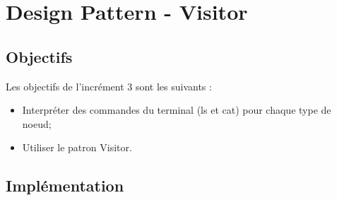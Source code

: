 
\newpage
\section{Design Pattern - Visitor}

\subsection{Objectifs}

Les objectifs de l'incrément 3 sont les suivants :\\
\begin{itemize}
\item Interpréter des commandes du terminal (ls et cat) pour chaque type de noeud;
\item Utiliser le patron Visitor.\\
\end{itemize}

\subsection{Implémentation}

